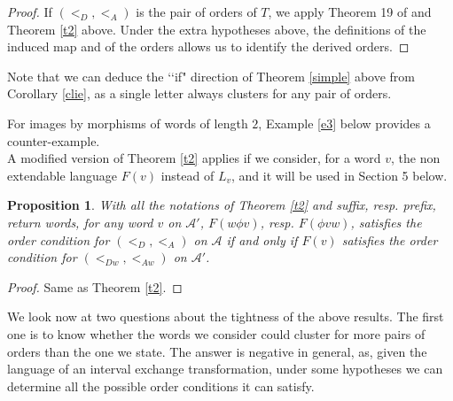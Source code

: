 \documentclass[12pt,a4paper]{amsart}
\newtheorem{proposition}[theorem]{Proposition}
\begin{document}
\begin{proof} If $(<_D,<_A)$ is  the pair of orders of $T$, we apply Theorem 19 of \cite{fhuz} and Theorem \ref{t2} above. Under the extra  hypotheses above, the definitions of the induced map and of the orders allows us to identify the derived orders. \end{proof}


Note that we can deduce the ‘‘if" direction of Theorem \ref{simple} above from Corollary \ref{clie}, as a single letter always clusters for any pair of orders.
 
 For images by morphisms of words of length $2$,  Example \ref{e3} below provides a counter-example. \\
 
 A modified version of Theorem \ref{t2} applies if we consider, for a word $v$, the non extendable language $F(v)$  instead of   $L_v$, and it will be used in Section 5 below.
 
 \begin{proposition}\label{t2r} With all the notations of Theorem \ref{t2} and suffix, resp. prefix, return words, for any word $v$ on $\mathcal A'$,  $F(w\phi v)$, resp. $F(\phi vw)$,  satisfies the order condition for   $(<_D,<_A)$ on $\mathcal A$  if and only if $F(v)$  satisfies the order condition for  $(<_ {Dw},<_ {Aw})$ on $\mathcal A'$.
\end{proposition}
\begin{proof} Same as Theorem \ref{t2}.\end{proof}


We look now at two questions about the tightness of the above results. The first one is to know whether the words we consider could cluster for more pairs of orders than the one we state. The answer is negative in general, as, given the language of an interval exchange transformation, under some hypotheses we can  determine all the possible order conditions it can satisfy.
\end{document}
